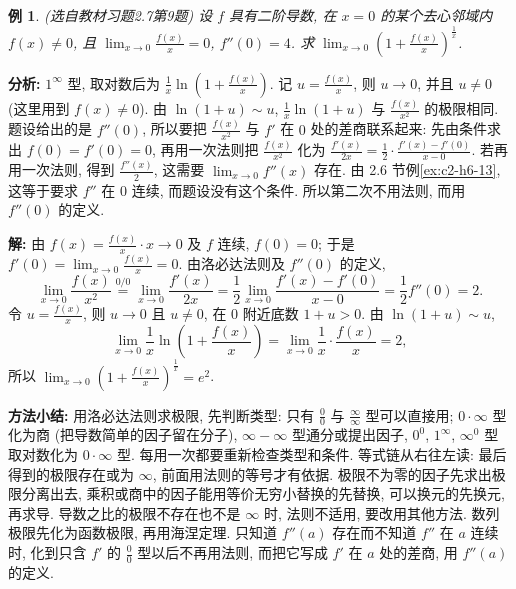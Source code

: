 \documentclass[UTF8,openany]{ctexbook}
\theoremstyle{chinesetextbook}
\newtheorem{example}{例}[section]
\newenvironment{cnsolution}{\par\indent\textbf{解:} \ignorespaces}{\par}
\begin{document}
\begin{example}\label{ex:c2-h7-9}
\textnormal{(选自教材习题2.7第9题)} 设 $f$ 具有二阶导数, 在 $x=0$ 的某个去心邻域内 $f(x)\ne0$, 且 $\displaystyle\lim_{x\to0}\frac{f(x)}x=0$, $f''(0)=4$. 求 $\displaystyle\lim_{x\to0}\left(1+\frac{f(x)}x\right)^{\frac1x}$.
\end{example}
\par\indent\textbf{分析:} $1^\infty$ 型, 取对数后为 $\displaystyle\frac1x\ln\left(1+\frac{f(x)}x\right)$. 记 $\displaystyle u=\frac{f(x)}x$, 则 $u\to0$, 并且 $u\ne0$ (这里用到 $f(x)\ne0$). 由 $\ln(1+u)\sim u$, $\displaystyle\frac1x\ln(1+u)$ 与 $\displaystyle\frac{f(x)}{x^2}$ 的极限相同. 题设给出的是 $f''(0)$, 所以要把 $\displaystyle\frac{f(x)}{x^2}$ 与 $f'$ 在 $0$ 处的差商联系起来: 先由条件求出 $f(0)=f'(0)=0$, 再用一次法则把 $\displaystyle\frac{f(x)}{x^2}$ 化为 $\displaystyle\frac{f'(x)}{2x}=\frac12\cdot\frac{f'(x)-f'(0)}{x-0}$. 若再用一次法则, 得到 $\displaystyle\frac{f''(x)}2$, 这需要 $\displaystyle\lim_{x\to0}f''(x)$ 存在. 由 2.6 节例\ref{ex:c2-h6-13}, 这等于要求 $f''$ 在 $0$ 连续, 而题设没有这个条件. 所以第二次不用法则, 而用 $f''(0)$ 的定义.
\begin{cnsolution}
由 $\displaystyle f(x)=\frac{f(x)}x\cdot x\to0$ 及 $f$ 连续, $f(0)=0$; 于是 $\displaystyle f'(0)=\lim_{x\to0}\frac{f(x)}x=0$. 由洛必达法则及 $f''(0)$ 的定义,
\[
\lim_{x\to0}\frac{f(x)}{x^2}\overset{0/0}{=}\lim_{x\to0}\frac{f'(x)}{2x}=\frac12\lim_{x\to0}\frac{f'(x)-f'(0)}{x-0}=\frac12f''(0)=2.
\]
令 $\displaystyle u=\frac{f(x)}x$, 则 $u\to0$ 且 $u\ne0$, 在 $0$ 附近底数 $1+u>0$. 由 $\ln(1+u)\sim u$,
\[
\lim_{x\to0}\frac1x\ln\left(1+\frac{f(x)}x\right)=\lim_{x\to0}\frac1x\cdot\frac{f(x)}x=2,
\]
所以 $\displaystyle\lim_{x\to0}\left(1+\frac{f(x)}x\right)^{\frac1x}=e^2$.
\end{cnsolution}
\par\indent\textbf{方法小结:} 用洛必达法则求极限, 先判断类型: 只有 $\displaystyle\frac00$ 与 $\displaystyle\frac\infty\infty$ 型可以直接用; $0\cdot\infty$ 型化为商 (把导数简单的因子留在分子), $\infty-\infty$ 型通分或提出因子, $0^0$, $1^\infty$, $\infty^0$ 型取对数化为 $0\cdot\infty$ 型. 每用一次都要重新检查类型和条件. 等式链从右往左读: 最后得到的极限存在或为 $\infty$, 前面用法则的等号才有依据. 极限不为零的因子先求出极限分离出去, 乘积或商中的因子能用等价无穷小替换的先替换, 可以换元的先换元, 再求导. 导数之比的极限不存在也不是 $\infty$ 时, 法则不适用, 要改用其他方法. 数列极限先化为函数极限, 再用海涅定理. 只知道 $f''(a)$ 存在而不知道 $f''$ 在 $a$ 连续时, 化到只含 $f'$ 的 $\displaystyle\frac00$ 型以后不再用法则, 而把它写成 $f'$ 在 $a$ 处的差商, 用 $f''(a)$ 的定义.
\end{document}
